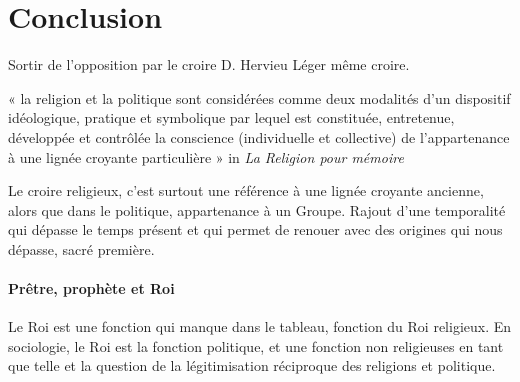       \section{Conclusion}
      
      Sortir de l’opposition par le croire D. Hervieu Léger même croire. 
      
      \begin{Def}[Le croire]
         « la religion et la politique sont considérées comme deux modalités d’un dispositif idéologique, pratique et symbolique par lequel est constituée, entretenue, développée et contrôlée la conscience (individuelle et collective) de l’appartenance à une lignée croyante particulière » in \textit{La Religion pour mémoire }
      \end{Def}   

Le croire religieux, c'est surtout une référence à une lignée croyante ancienne, alors que dans le politique, appartenance à un Groupe. Rajout d'une temporalité qui dépasse le temps présent et qui permet de renouer avec des origines qui nous dépasse, sacré première. 

\paragraph{Prêtre, prophète et Roi} Le Roi est une fonction qui manque dans le tableau, fonction du Roi religieux. En sociologie, le Roi est la fonction politique, et une fonction non religieuses en tant que telle et la question de la légitimisation réciproque des religions et politique.
